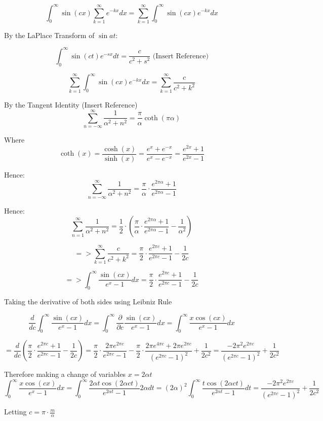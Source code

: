 \documentclass[a4paper]{article}
\begin{document}
$$\int_{0}^{\infty}\sin(cx)\sum\limits_{k=1}^{\infty} e^{-kx}dx
=\sum\limits_{k=1}^{\infty} \int_{0}^{\infty}\sin(cx)e^{-kx} dx
$$

By the LaPlace Transform of $\sin{at}$:

$$\int_{0}^{\infty}\sin(ct)e^{-sx} dt
=\frac{c}{c^2 + s^2} \mbox{  (Insert Reference)}
$$

$$
\sum\limits_{k=1}^{\infty} \int_{0}^{\infty}\sin(cx)e^{-kx} dx
=\sum\limits_{k=1}^{\infty} \frac{c}{c^2+k^2}
$$

By the Tangent Identity (Insert Reference)
$$\sum\limits_{n=-\infty}^{\infty} \frac{1}{\alpha^2+n^2}
=\frac{\pi}{\alpha}\coth(\pi \alpha)$$

Where $$\coth(x)=\frac{\cosh(x)}{\sinh(x)}=\frac{e^{x}+e^{-x}}{e^{x}-e^{-x}}
=\frac{e^{2x}+1}{e^{2x}-1}
$$

Hence:
$$\sum\limits_{n=-\infty}^{\infty} \frac{1}{\alpha^2+n^2}
=\frac{\pi}{\alpha}\cdot\frac{e^{2\pi \alpha}+1}{e^{2\pi \alpha}-1}
$$

Hence:
$$\sum\limits_{n=1}^{\infty} \frac{1}{\alpha^2+n^2}
=\frac{1}{2}\cdot(\frac{\pi}{\alpha}\cdot\frac{e^{2\pi \alpha}+1}{e^{2\pi \alpha}-1} - \frac{1}{\alpha^2})
$$

$$=> 
\sum\limits_{k=1}^{\infty} \frac{c}{c^2+k^2}
=\frac{\pi}{2}\cdot\frac{e^{2\pi c}+1}{e^{2\pi c}-1} - \frac{1}{2c}
$$

$$=>
\int_{0}^{\infty}\frac{\sin(cx)}{e^{x}-1}dx
=\frac{\pi}{2}\cdot\frac{e^{2\pi c}+1}{e^{2\pi c}-1} - \frac{1}{2c}
$$

Taking the derivative of both sides using Leibniz Rule

$$
\frac{d}{dc}\int_{0}^{\infty}\frac{\sin(cx)}{e^{x}-1}dx
=\int_{0}^{\infty}\frac{\partial}{\partial c}\frac{\sin(cx)}{e^{x}-1}dx
=\int_{0}^{\infty}\frac{x\cos(cx)}{e^{x}-1}dx
$$

$$=\frac{d}{dc}(\frac{\pi}{2}\cdot\frac{e^{2\pi c}+1}{e^{2\pi c}-1} - \frac{1}{2c})
= \frac{\pi}{2}\cdot\frac{2\pi e^{2\pi c}}{e^{2\pi c}-1} -\frac{\pi}{2}\cdot\frac{2\pi e^{4\pi c}+2\pi e^{2\pi c}}{(e^{2\pi c}-1)^2} + \frac{1}{2c^2}
= \frac{-2\pi^2e^{2\pi c}}{(e^{2\pi c}-1)^2} + \frac{1}{2c^2}
$$


Therefore making a change of variables $x=2\alpha t$
$$
\int_{0}^{\infty}\frac{x\cos(cx)}{e^{x}-1}dx
=\int_{0}^{\infty}\frac{2\alpha t\cos(2\alpha ct)}{e^{2\alpha t}-1}2\alpha dt
=(2\alpha)^2\int_{0}^{\infty}\frac{t\cos(2\alpha ct)}{e^{2\alpha t}-1}dt
=\frac{-2\pi^2e^{2\pi c}}{(e^{2\pi c}-1)^2} + \frac{1}{2c^2}
$$

Letting $c=\pi \cdot \frac{m}{\alpha}$ 
\end{document}
